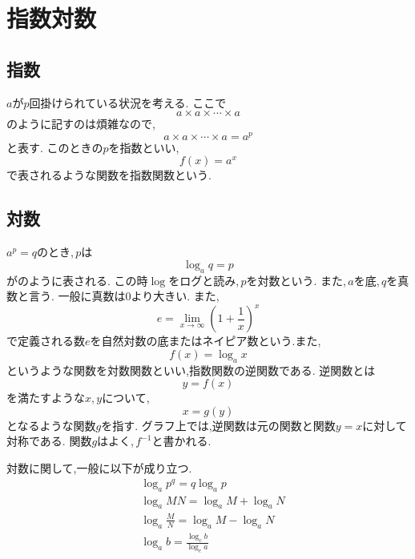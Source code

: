 
  \section{指数対数}
    \subsection{指数}
      $a$が$p$回掛けられている状況を考える.
      ここで
      \[
        a\times a\times\cdots\times a
      \]
      のように記すのは煩雑なので,
      \[
        a\times a\times\cdots\times a=a^p
      \]
      と表す.
      このときの$p$を指数といい,
      \[
        f(x)=a^x
      \]
      で表されるような関数を指数関数という.
    \subsection{対数}
      $a^p=q$のとき,\,$p$は
      \[
        \log_a{q}=p
      \]
      がのように表される.
      この時$\log$をログと読み,\,$p$を対数という.
      また,\,$a$を底,\,$q$を真数と言う.
      一般に真数は0より大きい.
      また,
      \[
        e=\lim_{x \to \infty} \left(1+\frac{1}{x}\right)^x
      \]
      で定義される数$e$を自然対数の底またはネイピア数という.また,
      \[
        f(x)=\log_a x
      \]
      というような関数を対数関数といい,指数関数の逆関数である.
      逆関数とは
      \[
        y=f(x)
      \]
      を満たすような$x,y$について,
      \[
        x=g(y)
      \]
      となるような関数$g$を指す.
      グラフ上では,逆関数は元の関数と関数$y=x$に対して対称である.
      関数$g$はよく,\,$f^{-1}$と書かれる.

      対数に関して,一般に以下が成り立つ.
      \begin{align*}
        &\log_a{p^q}=q\log_a{p}\\
        &\log_a{MN}=\log_a{M}+\log_a{N}\\
        &\log_a{\frac{M}{N}}=\log_a{M}-\log_a{N}\\
        &\log_a{b}=\frac{\log_c{b}}{\log_c{a}}
      \end{align*}
    
